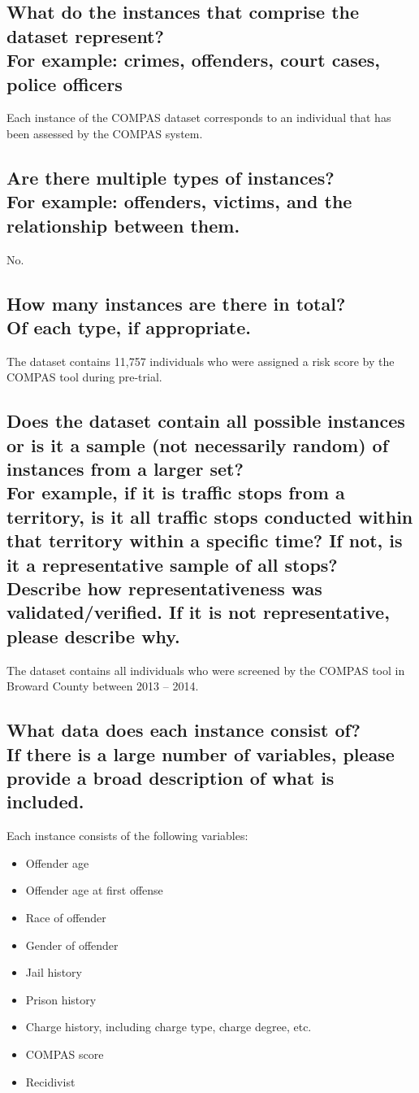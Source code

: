 \documentclass[letterpaper, 10 pt, conference]{ieeeconf}  %
\newcommand{\subtitle}[1]{{\\ \small \normalfont \color{purple} #1}}
\begin{document}
\subsection{What do the instances that comprise the dataset represent? \subtitle{For example: crimes, offenders, court cases, police officers}}

Each instance of the COMPAS dataset corresponds to an individual that has been assessed by the COMPAS system. 

\subsection{Are there multiple types of instances? \subtitle{For example: offenders, victims, and the relationship between them.}}

No.

\subsection{How many instances are there in total? \subtitle{Of each type, if appropriate.}}

The dataset contains 11,757 individuals who were assigned a risk score by the COMPAS tool during pre-trial.

\subsection{Does the dataset contain all possible instances or is it a sample (not necessarily random) of instances from a larger set? \subtitle{For example, if it is traffic stops from a territory, is it all traffic stops conducted within that territory within a specific time? If not, is it a representative sample of all stops? Describe how representativeness was validated/verified. If it is not representative, please describe why.}}

The dataset contains all individuals who were screened by the COMPAS tool in Broward County between 2013 -- 2014.

\subsection{What data does each instance consist of? \subtitle{If there is a large number of variables, please provide a broad description of what is included.}}

Each instance consists of the following variables:

\begin{itemize}
    \item Offender age
    \item Offender age at first offense
    \item Race of offender
    \item Gender of offender
    \item Jail history
    \item Prison history
    \item Charge history, including charge type, charge degree, etc.
    \item COMPAS score
    \item Recidivist
\end{itemize}
\end{document}
